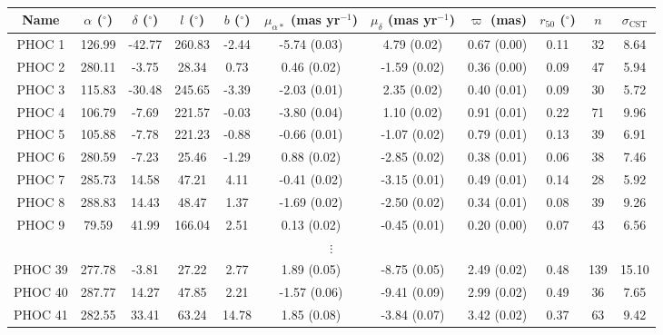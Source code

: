 \begin{table}

\caption[Mean parameters for a selection of the new OCs detected in this study]{\label{c2:table:new_ocs_short}}

\centering
\begin{tabular}{*{11}{c}}

\hline\hline

Name & $\alpha$ ($^\circ$) & $\delta$ ($^\circ$) & $l$ ($^\circ$) & $b$ ($^\circ$) & $\mu_{\alpha*}$ (mas yr$^{-1}$) & $\mu_{\delta}$ (mas yr$^{-1}$) & $\varpi$ (mas) & $r_{50}$ ($^\circ$) & $n$ & $\sigma_{\text{CST}}$ \\

\hline

PHOC 1 & 126.99 & -42.77 & 260.83 & -2.44 & -5.74 (0.03) & 4.79 (0.02) & 0.67 (0.00) & 0.11 & 32 & 8.64 \\
PHOC 2 & 280.11 & -3.75 & 28.34 & 0.73 & 0.46 (0.02) & -1.59 (0.02) & 0.36 (0.00) & 0.09 & 47 & 5.94 \\
PHOC 3 & 115.83 & -30.48 & 245.65 & -3.39 & -2.03 (0.01) & 2.35 (0.02) & 0.40 (0.01) & 0.09 & 30 & 5.72 \\
PHOC 4 & 106.79 & -7.69 & 221.57 & -0.03 & -3.80 (0.04) & 1.10 (0.02) & 0.91 (0.01) & 0.22 & 71 & 9.96 \\
PHOC 5 & 105.88 & -7.78 & 221.23 & -0.88 & -0.66 (0.01) & -1.07 (0.02) & 0.79 (0.01) & 0.13 & 39 & 6.91 \\
PHOC 6 & 280.59 & -7.23 & 25.46 & -1.29 & 0.88 (0.02) & -2.85 (0.02) & 0.38 (0.01) & 0.06 & 38 & 7.46 \\
PHOC 7 & 285.73 & 14.58 & 47.21 & 4.11 & -0.41 (0.02) & -3.15 (0.01) & 0.49 (0.01) & 0.14 & 28 & 5.92 \\
PHOC 8 & 288.83 & 14.43 & 48.47 & 1.37 & -1.69 (0.02) & -2.50 (0.02) & 0.34 (0.01) & 0.08 & 39 & 9.26 \\
PHOC 9 & 79.59 & 41.99 & 166.04 & 2.51 & 0.13 (0.02) & -0.45 (0.01) & 0.20 (0.00) & 0.07 & 43 & 6.56 \\
\multicolumn{11}{c}{$\vdots$} \\ 
PHOC 39 & 277.78 & -3.81 & 27.22 & 2.77 & 1.89 (0.05) & -8.75 (0.05) & 2.49 (0.02) & 0.48 & 139 & 15.10 \\
PHOC 40 & 287.77 & 14.27 & 47.85 & 2.21 & -1.57 (0.06) & -9.41 (0.09) & 2.99 (0.02) & 0.49 & 36 & 7.65 \\
PHOC 41 & 282.55 & 33.41 & 63.24 & 14.78 & 1.85 (0.08) & -3.84 (0.07) & 3.42 (0.02) & 0.37 & 63 & 9.42 \\

\hline

\end{tabular}


\end{table}


